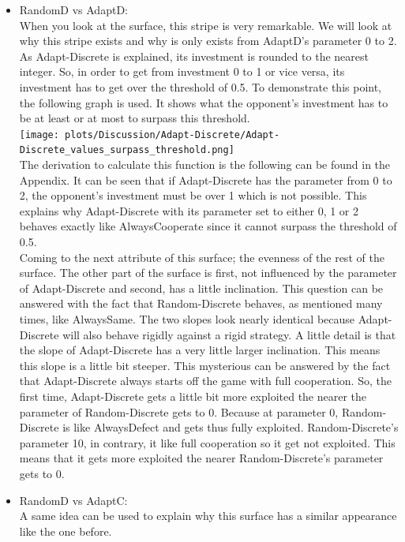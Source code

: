 \documentclass{article}
\begin{document}
\begin{itemize}
	\item RandomD vs AdaptD:\\
		When you look at the surface, this stripe is very remarkable.
		We will look at why this stripe exists and why is only exists from AdaptD's parameter 0 to 2.\\
		As Adapt-Discrete is explained, its investment is rounded to the nearest integer.
		So, in order to get from investment 0 to 1 or vice versa, its investment has to get over the threshold of 0.5.
		To demonstrate this point, the following graph is used.
		It shows what the opponent's investment has to be at least or at most to surpass this threshold.\\
		\texttt{[image: plots/Discussion/Adapt-Discrete/Adapt-Discrete\_values\_surpass\_threshold.png]}\\
		The derivation to calculate this function is the following can be found in the Appendix.
		It can be seen that if Adapt-Discrete has the parameter from 0 to 2, the opponent's investment must be over 1 which is not possible.
		This explains why Adapt-Discrete with its parameter set to either 0, 1 or 2 behaves exactly like AlwaysCooperate since it cannot surpass the threshold of 0.5.\\
		Coming to the next attribute of this surface; the evenness of the rest of the surface.
		The other part of the surface is first, not influenced by the parameter of Adapt-Discrete and second, has a little inclination.
		This question can be answered with the fact that Random-Discrete behaves, as mentioned many times, like AlwaysSame.
		The two slopes look nearly identical because Adapt-Discrete will also behave rigidly against a rigid strategy.
		A little detail is that the slope of Adapt-Discrete has a very little larger inclination.
		This means this slope is a little bit steeper.
		This mysterious can be answered by the fact that Adapt-Discrete always starts off the game with full cooperation.
		So, the first time, Adapt-Discrete gets a little bit more exploited the nearer the parameter of Random-Discrete gets to 0.
		Because at parameter 0, Random-Discrete is like AlwaysDefect and gets thus fully exploited.
		Random-Discrete's parameter 10, in contrary, it like full cooperation so it get not exploited.
		This means that it gets more exploited the nearer Random-Discrete's parameter gets to 0.\\
	\item RandomD vs AdaptC:\\
		A same idea can be used to explain why this surface has a similar appearance like the one before.

\end{itemize}
\end{document}
